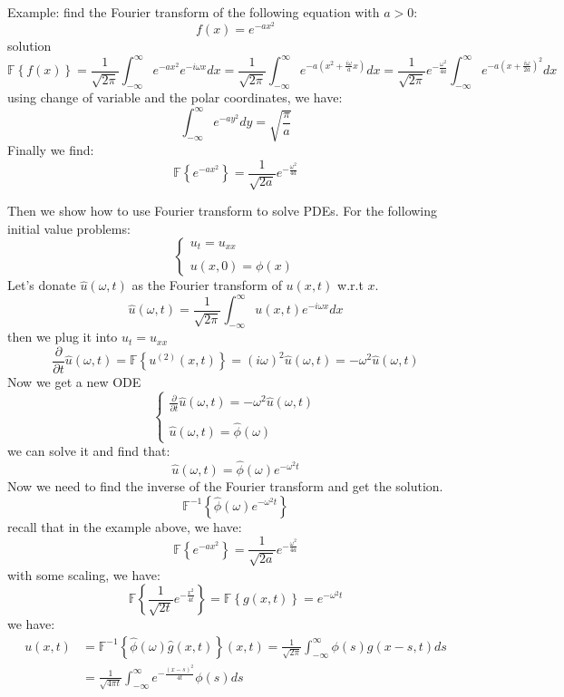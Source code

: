 \documentclass[12pt]{article} %
\begin{document}
Example: find the Fourier transform of the following equation with $a >0$:
$$
f(x) = e^{-a x^{2}}
$$solution
$$
\mathbb{F}\left\{ f(x) \right\} = \frac{1}{\sqrt{2\pi}} \int_{-\infty}^{\infty}e^{-a x^{2}} e^{-i\omega x}dx = \frac{1}{\sqrt{2\pi}} \int_{-\infty}^{\infty}e^{-a (x^{2}+ \frac{i \omega}{a}x)} dx = \frac{1}{\sqrt{2\pi}} e^{-\frac{\omega^{2}}{4a}}\int_{-\infty}^{\infty}e^{-a (x+ \frac{i \omega}{2a})^{2}} dx
$$using change of variable and the polar coordinates, we have:
$$
\int_{-\infty}^{\infty} e^{-a y^{2}}dy = \sqrt{\frac{\pi}{a}}
$$ Finally we find:
$$
\mathbb{F}\left\{ e^{-a x^{2}} \right\} = \frac{1}{\sqrt{2a}}e^{-\frac{\omega^{2}}{4a}}
$$\par Then we show how to use Fourier transform to solve PDEs. For the following initial value problems:
\begin{equation}
\left\{
\begin{array}{lll}
u_{t}  = u_{xx} \\
\\
u(x, 0) = \phi (x)
\end{array}\right.
\end{equation}
Let's donate $\hat{u}(\omega, t)$ as the Fourier transform of $u(x, t)$ w.r.t $x$.
$$
\hat{u}(\omega, t) = \frac{1}{\sqrt{2 \pi}} \int_{-\infty}^{\infty}u(x, t) e^{-i \omega x}dx
$$then we plug it into $u_{t}  = u_{xx}$
$$
\frac{\partial }{\partial t}\hat{u}(\omega, t) =  \mathbb{F} \left\{ u^{(2)}(x, t)  \right\} = (i\omega)^{2}\hat{u}(\omega, t)= -\omega^{2}\hat{u}(\omega, t)
$$Now we get a new ODE
\begin{equation}
\left\{
\begin{array}{lll}
\frac{\partial }{\partial t}\hat{u}(\omega, t)  =  -\omega^{2}\hat{u}(\omega, t) \\
\\
\hat{u}(\omega, t)  = \hat{\phi} (\omega)
\end{array}\right.
\end{equation}we can solve it and find that:
$$
\hat{u}(\omega, t) = \hat{\phi} (\omega) e^{-\omega^{2}t}
$$ Now we need to find the inverse of the Fourier transform and get the solution.
$$
\mathbb{F}^{-1}\left\{ \hat{\phi} (\omega) e^{-\omega^{2}t} \right\}
$$recall that in the example above, we have:
$$
\mathbb{F}\left\{ e^{-a x^{2}} \right\} = \frac{1}{\sqrt{2a}}e^{-\frac{\omega^{2}}{4a}}
$$with some scaling, we have:
$$
\mathbb{F}\left\{ \frac{1}{\sqrt{2 t}} e^{- \frac{x^{2}}{4t}} \right\} =\mathbb{F}\left\{ g(x, t) \right\} =e^{-\omega^{2}t}
$$
we have:
\begin{align*}
u(x, t) &=\mathbb{F}^{-1}\left\{ \hat{\phi} (\omega) \hat{g}(x, t) \right\}(x, t) = \frac{1}{\sqrt{2 \pi}}\int_{-\infty}^{\infty} \phi(s) g(x-s, t) ds\\
&= \frac{1}{\sqrt{4 \pi t}}\int_{-\infty}^{\infty} e^{- \frac{(x-s)^{2}}{4t}} \phi(s) ds
\end{align*}\par
\end{document}
